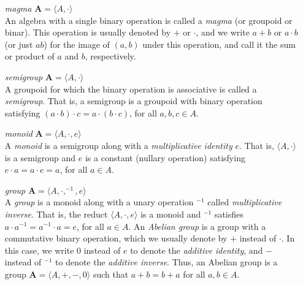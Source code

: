\documentclass[12pt]{article}
\theoremstyle{plain}
\theoremstyle{definition}
\theoremstyle{remark}
\theoremstyle{remark}
\numberwithin{theorem}{section}
\numberwithin{equation}{section}
\newcommand{\<}{\ensuremath{\langle}}
\renewcommand{\>}{\ensuremath{\rangle}}
\newcommand{\bA}{\ensuremath{\mathbf{A}}}
\begin{document}
\begin{itemize}
\item[\emph{magma}] $\bA = \langle A, \cdot\rangle$ \\
An algebra with a single binary operation is called a \emph{magma} 
(or groupoid or binar). This operation is 
usually denoted by $+$ or $\cdot$, and we write $a+b$ or $a\cdot b$ 
(or just $ab$) for the image of $(a, b)$ under
this operation, and call it the sum or product of $a$ and $b$, respectively.

\item[\emph{semigroup}] $\bA = \langle A, \cdot\rangle$ \\
A groupoid for which 
the binary operation is associative is called a \emph{semigroup}. That is,
a semigroup is a groupoid with binary operation satisfying 
$(a\cdot b)\cdot c = a\cdot (b\cdot c)$, for all $a, b, c \in A$.

\item[\emph{monoid}] $\bA = \langle A, \cdot, e\rangle$\\
 A \emph{monoid} 
  is a semigroup along with a \emph{multiplicative identity} $e$. That is, 
$\langle A, \cdot \rangle$ is a semigroup and $e$ is a constant 
(nullary operation) satisfying $e\cdot a = a\cdot e = a$, for all $a\in A$.

\item[\emph{group}] $\bA = \langle A, \cdot, ^{-1}, e\rangle$\\
A \emph{group} is a monoid along with a unary operation $^{-1}$ called \emph{multiplicative inverse}.
That is, the reduct $\langle A, \cdot, e \rangle$ is a monoid and
$^{-1}$ satisfies $a\cdot a^{-1} =  a^{-1}\cdot a = e$, for all $a\in A$. 
An \emph{Abelian group} is a group with a commutative binary
operation, which we usually denote by $+$ instead
of $\cdot$.  In this case, we write $0$ instead of $e$ to
denote the \emph{additive identity}, and $-$ instead of
$^{-1}$ to denote the \emph{additive inverse}.  Thus, an Abelian
group is a group $\bA = \langle A, +, -, 0\rangle$ such that 
$a+b = b+a$ for all $a, b \in A$.



\end{itemize}
\end{document}
